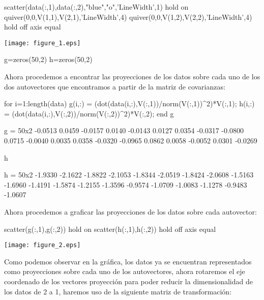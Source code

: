 \documentclass{article}
\begin{document}
\begin{matlabcode}
scatter(data(:,1),data(:,2),"blue","o",'LineWidth',1)
hold on
quiver(0,0,V(1,1),V(2,1),'LineWidth',4)
quiver(0,0,V(1,2),V(2,2),'LineWidth',4)
hold off
axis equal
\end{matlabcode}
\begin{center}
\texttt{[image: figure\_1.eps]}
\end{center}
\begin{matlabcode}
g=zeros(50,2)
h=zeros(50,2)
\end{matlabcode}
Ahora procedemos a encontrar las proyecciones de los datos sobre cada uno de los dos autovectores que encontramos a partir de la matriz de covarianzas:
\begin{matlabcode}
for i=1:length(data)
g(i,:) = (dot(data(i,:),V(:,1))/norm(V(:,1))^2)*V(:,1);
h(i,:) = (dot(data(i,:),V(:,2))/norm(V(:,2))^2)*V(:,2);
end 
g
\end{matlabcode}
\begin{matlaboutput}
g = 50x2    
   -0.0513    0.0459
   -0.0157    0.0140
   -0.0143    0.0127
    0.0354   -0.0317
   -0.0800    0.0715
   -0.0040    0.0035
    0.0358   -0.0320
   -0.0965    0.0862
    0.0058   -0.0052
    0.0301   -0.0269
\end{matlaboutput}
\begin{matlabcode}
h
\end{matlabcode}
\begin{matlaboutput}
h = 50x2    
   -1.9330   -2.1622
   -1.8822   -2.1053
   -1.8344   -2.0519
   -1.8424   -2.0608
   -1.5163   -1.6960
   -1.4191   -1.5874
   -1.2155   -1.3596
   -0.9574   -1.0709
   -1.0083   -1.1278
   -0.9483   -1.0607
\end{matlaboutput}
Ahora procedemos a graficar las proyecciones de los datos sobre cada autovector:
\begin{matlabcode}
scatter(g(:,1),g(:,2))
hold on
scatter(h(:,1),h(:,2))
hold off
axis equal
\end{matlabcode}
\begin{center}
\texttt{[image: figure\_2.eps]}
\end{center}
Como podemos observar en la gráfica, los datos ya se encuentran representados como proyecciones sobre cada uno de los autovectores, ahora rotaremos el eje coordenado de los vectores proyección para poder reducir la dimensionalidad de los datos de 2 a 1, haremos uso de la siguiente matriz de transformación:
\end{document}
